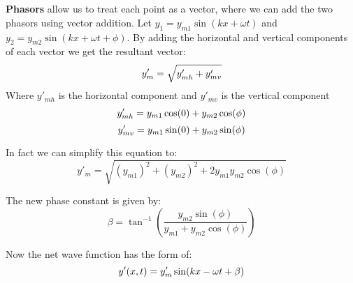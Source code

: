 \documentclass[11pt]{article}
\begin{document}
    \hfill
   \noindent \\ \\ \textbf{Phasors} allow us to treat each point as a vector, where we can
    add the two phasors using vector addition.
    Let $y_1 = y_{m1} \sin(kx + \omega t)$ and $y_2 = y_{m2} \sin(kx + \omega t + \phi)$.
    By adding the horizontal and vertical components of each vector we get the resultant vector:
    \begin{equation}
        y'_{m} = \sqrt{y'_{mh} +y'_{mv}} \notag
    \end{equation}
    Where  $y'_{mh}$ is the horizontal component and $y'_{mv}$ is the vertical component
    \begin{equation}
        y'_{mh} = y_{m1}\cos(0) + y_{m2}\cos(\phi) \notag
    \end{equation}
    \begin{equation}
        y'_{mv} = y_{m1}\sin(0) + y_{m2}\sin(\phi) \notag
    \end{equation}

    \noindent In fact we can simplify this equation to:
    \begin{equation}
        y'_{m} = \sqrt{(y_{m1})^2 + (y_{m2})^2 + 2y_{m1}y_{m2}\cos(\phi)} \tag{net amplitude}
    \end{equation}
    
    \noindent The new phase constant is given by:
    \begin{equation}
        \beta = \tan^{-1}({\frac{y_{m2}\sin(\phi)}{y_{m1} + y_{m2} \cos(\phi)}}) \tag{net phase constant}
    \end{equation}

    \noindent Now the net wave function has the form of:
    \begin{equation}
        y'(x,t) =  y'_{m}\sin(kx - \omega t + \beta) \notag
    \end{equation}
\end{document}
